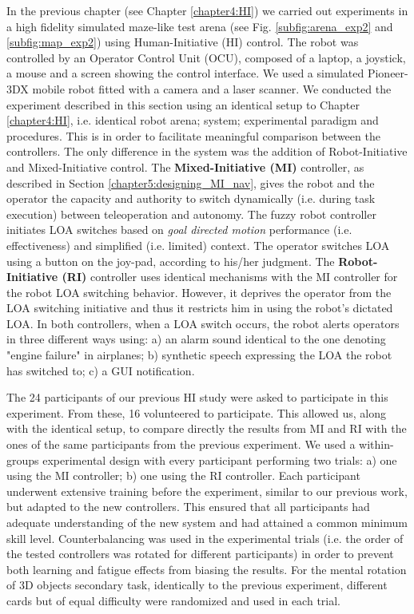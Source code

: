 \documentclass[a4paper,12pt,oneside,openright]{bhamthesis}
\begin{document}
In the previous chapter (see Chapter \ref{chapter4:HI}) we carried out experiments in a high fidelity simulated maze-like test arena (see Fig. \ref{subfig:arena_exp2} and \ref{subfig:map_exp2}) using Human-Initiative (HI) control. The robot was controlled by an Operator Control Unit (OCU), composed of a laptop, a joystick, a mouse and a screen showing the control interface. We used a simulated Pioneer-3DX mobile robot fitted with a camera and a laser scanner. We conducted the experiment described in this section using an identical setup to Chapter \ref{chapter4:HI}, i.e. identical robot arena; system; experimental paradigm and procedures. This is in order to facilitate meaningful comparison between the controllers. The only difference in the system was the addition of Robot-Initiative and Mixed-Initiative control. The \textbf{Mixed-Initiative (MI)} controller, as described in Section \ref{chapter5:designing_MI_nav}, gives the robot and the operator the capacity and authority to switch dynamically (i.e. during task execution) between teleoperation and autonomy. The fuzzy robot controller initiates LOA switches based on \textit{goal directed motion} performance (i.e. effectiveness) and simplified (i.e. limited) context. The operator switches LOA using a button on the joy-pad, according to his/her judgment. The \textbf{Robot-Initiative (RI)} controller uses identical mechanisms with the MI controller for the robot LOA switching behavior. However, it deprives the operator from the LOA switching initiative and thus it restricts him in using the robot's dictated LOA. In both controllers, when a LOA switch occurs, the robot alerts operators in three different ways using: a) an alarm sound identical to the one denoting "engine failure" in airplanes; b) synthetic speech expressing the LOA the robot has switched to; c) a GUI notification.

The 24 participants of our previous HI study were asked to participate in this experiment. From these, 16 volunteered to participate. This allowed us, along with the identical setup, to compare directly the results from MI and RI with the ones of the same participants from the previous experiment. We used a within-groups experimental design with every participant performing two trials: a) one using the MI controller; b) one using the RI controller. Each participant underwent extensive training before the experiment, similar to our previous work, but adapted to the new controllers. This ensured that all participants had adequate understanding of the new system and had attained a common minimum skill level. Counterbalancing was used in the experimental trials (i.e. the order of the tested controllers was rotated for different participants) in order to prevent both learning and fatigue effects from biasing the results. For the mental rotation of 3D objects secondary task, identically to the previous experiment, different cards but of equal difficulty \citep{Ganis2015} were randomized and used in each trial. 
\end{document}
